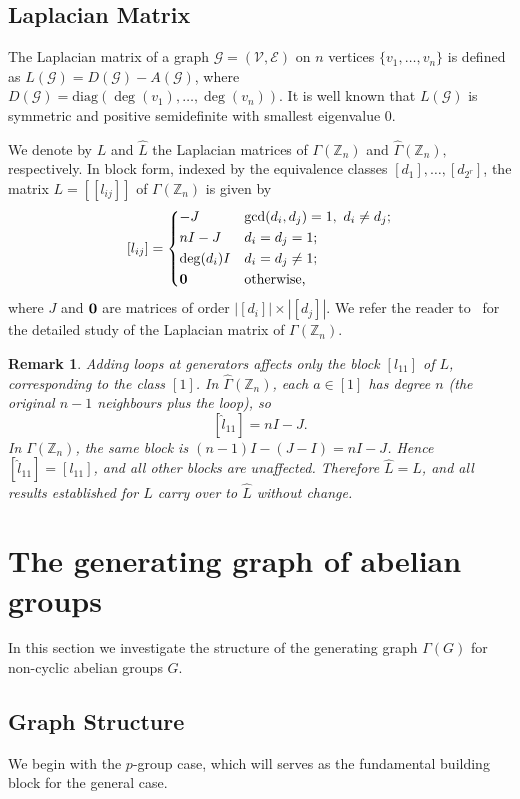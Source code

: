 \documentclass[11pt]{article}
\def \G {{\mathcal G}}
\def \E {{\mathcal E}}
\def \V {{\mathcal V}}
\newtheorem{rem}[theorem]{Remark}
\begin{document}
\subsection*{Laplacian Matrix}

The Laplacian matrix of a graph $\G = (\V, \E)$ on $n$ vertices $\{v_1,\dots ,v_n\}$ is 
defined as $L(\G) = D(\G) - A(\G)$, where $D(\G) = \mathrm{diag}
(\deg(v_1), \dots, \deg(v_n))$. It is well known that $L(\G)$ is symmetric 
and positive semidefinite with smallest eigenvalue $0$.

We denote by $L$ and $\widehat{L}$ the Laplacian matrices of 
$\Gamma(\mathbb{Z}_n)$ and $\widehat{\Gamma}(\mathbb{Z}_n),$ 
respectively. In block form, indexed by the equivalence classes 
$[d_1], \dots, [d_{2^r}]$, the matrix $L=\left[[l_{ij}]\right]$ of $\Gamma(\mathbb{Z}_n)$ is given by
\[
[l_{ij}] = \begin{dcases}
-J       & \gcd(d_i, d_j) = 1, \ d_i \neq d_j; \\
nI - J   & d_i = d_j = 1; \\
\deg(d_i)I & d_i = d_j \neq 1; \\
\bf{0}        & \text{otherwise,}
\end{dcases}
\]
where $J$ and $\bf 0$ are matrices of order $|[d_i]| \times |[d_j]|$. 
We refer the reader to~\cite{Me} for the detailed study of the 
Laplacian matrix of $\Gamma(\mathbb{Z}_n)$.

\begin{rem}
Adding loops at generators affects only the block $[l_{11}]$ of $L$, 
corresponding to the class $[1]$. In $\widehat{\Gamma}(\mathbb{Z}_n)$, 
each $a \in [1]$ has degree $n$ (the original $n-1$ neighbours plus 
the loop), so
$$[\widehat{l}_{11}] = nI - J.$$
In $\Gamma(\mathbb{Z}_n)$, the same block is $(n-1)I - (J - I) = nI - J$.
Hence $[\widehat{l}_{11}] = [l_{11}]$, and all other blocks are 
unaffected. Therefore $\widehat{L} = L$, and all results established 
for $L$ carry over to $\widehat{L}$ without change.
\end{rem}

\section{The generating graph of abelian groups}\label{sec:5}
In this section we investigate the structure of the generating graph $\Gamma(G)$ for non-cyclic abelian groups $G$. 
\subsection{Graph Structure}
We begin with the $p$-group case, which will serves as the fundamental building block for the general case.
\end{document}
